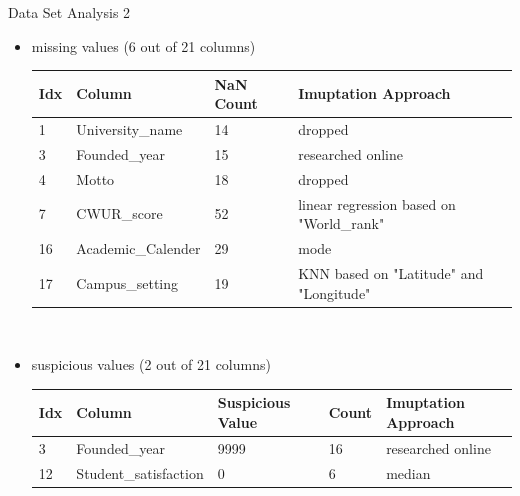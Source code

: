 \documentclass{beamer} %
\begin{document}
\begin{frame}{Data Set Analysis 2}
  \vspace{-1cm}
  \begin{itemize}
  \item missing values (6 out of 21 columns)
    \begin{table}[h]
      \centering
      \tiny
      \begin{tabular}{l|l|l|l}
        Idx & Column & NaN Count & Imuptation Approach \\
        \hline
        1  & University\_name   & 14 & dropped \\
        3  & Founded\_year      & 15 & researched online \\
        4  & Motto              & 18 & dropped \\
        7  & CWUR\_score        & 52 & linear regression based on "World\_rank" \\
        16 & Academic\_Calender & 29 & mode \\
        17 & Campus\_setting    & 19 & KNN based on "Latitude" and "Longitude"
      \end{tabular}\hfill\
      \label{tab:missing_values_nan}
    \end{table}
  \item suspicious values (2 out of 21 columns)
    \begin{table}[h]
      \centering
      \tiny
      \begin{tabular}{l|l|l|l|l}
        Idx & Column & Suspicious Value & Count & Imuptation Approach \\
        \hline
        3  & Founded\_year & 9999 & 16 & researched online \\
        12  & Student\_satisfaction & 0 & 6 & median \\
      \end{tabular}\hfill\
      \label{tab:missing_values_zero}
    \end{table}
  \end{itemize}
\end{frame}
\end{document}

